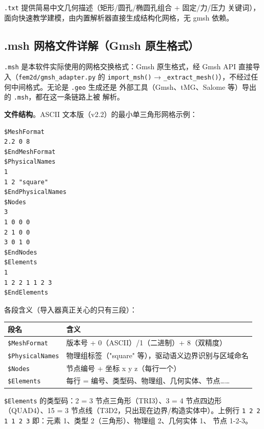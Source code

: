 \documentclass[12pt,a4paper]{ctexart}
\newcommand{\fem}{\Verb}
\begin{document}
\fem|.txt| 提供简易中文几何描述（矩形/圆孔/椭圆孔组合 + 固定/力/压力
关键词），面向快速教学建模，由内置解析器直接生成结构化网格，无 gmsh 依赖。

\subsection{.msh 网格文件详解（Gmsh 原生格式）}

\fem|.msh| 是本软件实际使用的网格交换格式：Gmsh 原生格式，经 Gmsh API
直接导入（\fem|fem2d/gmsh_adapter.py| 的 \fem|import_msh()| →
\fem|_extract_mesh()|），不经过任何中间格式。无论是 \fem|.geo| 生成还是
外部工具（Gmsh、tMG、Salome 等）导出的 \fem|.msh|，都在这一条链路上被
解析。

\textbf{文件结构}。ASCII 文本版（v2.2）的最小单三角形网格示例：
\begin{lstlisting}
$MeshFormat
2.2 0 8
$EndMeshFormat
$PhysicalNames
1
1 2 "square"
$EndPhysicalNames
$Nodes
3
1 0 0 0
2 1 0 0
3 0 1 0
$EndNodes
$Elements
1
1 2 2 1 1 2 3
$EndElements
\end{lstlisting}

各段含义（导入器真正关心的只有三段）：

\begin{center}\small
\begin{tabular}{ll}
段名 & 含义 \\ \hline
\fem|$MeshFormat| & 版本号 + 0（ASCII）/1（二进制）+ 8（双精度） \\
\fem|$PhysicalNames| & 物理组标签（"square" 等），驱动语义边界识别与区域命名 \\
\fem|$Nodes| & 节点编号 + 坐标 x y z（每行一个） \\
\fem|$Elements| & 每行 = 编号、类型码、物理组、几何实体、节点…… \\
\end{tabular}
\end{center}

\fem|$Elements| 的类型码：2 = 3 节点三角形（TRI3）、3 = 4 节点四边形
（QUAD4）、15 = 3 节点线（T3D2，只出现在边界/构造实体中）。上例行
\fem|1 2 2 1 1 2 3| 即：元素 1、类型 2（三角形）、物理组 2、几何实体 1、
节点 1-2-3。
\end{document}
